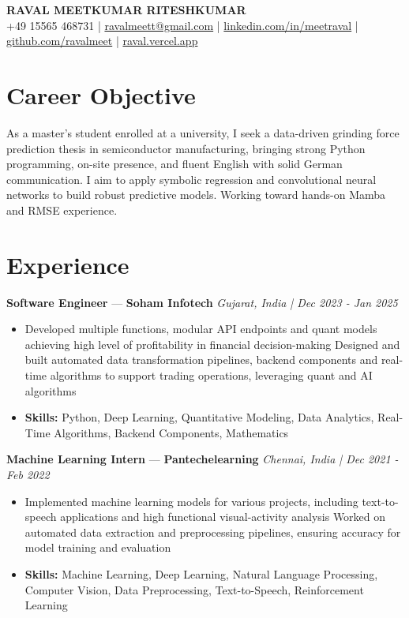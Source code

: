 \documentclass[a4paper,10pt]{article}
\begin{document}
\begin{center}
  {\Large\bfseries RAVAL MEETKUMAR RITESHKUMAR}\\[2pt]
  {\small +49 15565 468731 \;|\; \href{mailto:ravalmeett@gmail.com}{ravalmeett@gmail.com} \;|\; \href{https://www.linkedin.com/in/meetraval/}{linkedin.com/in/meetraval} \;|\; \href{https://github.com/ravalmeet}{github.com/ravalmeet} \;|\; \href{https://raval.vercel.app/}{raval.vercel.app}}
\end{center}
\vspace{-3pt}

\section*{Career Objective}
As a master's student enrolled at a university, I seek a data-driven grinding force prediction thesis in semiconductor manufacturing, bringing strong Python programming, on-site presence, and fluent English with solid German communication. I aim to apply symbolic regression and convolutional neural networks to build robust predictive models. Working toward hands-on Mamba and RMSE experience.\par

\section*{Experience}
\textbf{Software Engineer} — \textbf{Soham Infotech} \hfill \textit{Gujarat, India \;|\; Dec 2023 - Jan 2025}\par
\vspace{1pt}
\begin{itemize}
  \item Developed multiple functions, modular API endpoints and quant models achieving high level of profitability in financial decision-making Designed and built automated data transformation pipelines, backend components and real-time algorithms to support trading operations, leveraging quant and AI algorithms
  \item \textbf{Skills:} Python, Deep Learning, Quantitative Modeling, Data Analytics, Real-Time Algorithms, Backend Components, Mathematics
\end{itemize}
\vspace{3pt}
\textbf{Machine Learning Intern} — \textbf{Pantechelearning} \hfill \textit{Chennai, India \;|\; Dec 2021 - Feb 2022}\par
\vspace{1pt}
\begin{itemize}
  \item Implemented machine learning models for various projects, including text-to-speech applications and high functional visual-activity analysis Worked on automated data extraction and preprocessing pipelines, ensuring accuracy for model training and evaluation
  \item \textbf{Skills:} Machine Learning, Deep Learning, Natural Language Processing, Computer Vision, Data Preprocessing, Text-to-Speech, Reinforcement Learning
\end{itemize}
\end{document}
